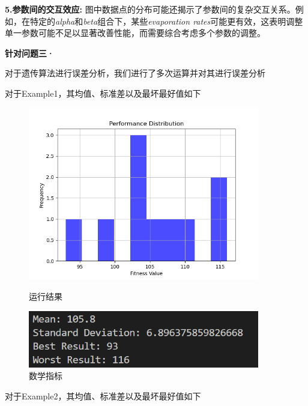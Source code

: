 \documentclass[withoutpreface,bwprint]{thesis-config}
\begin{document}
\par \textbf{5.参数间的交互效应:}
图中数据点的分布可能还揭示了参数间的复杂交互关系。例如，在特定的\textit{alpha}和\textit{beta}组合下，某些\textit{evaporation rates}可能更有效，这表明调整单一参数可能不足以显著改善性能，而需要综合考虑多个参数的调整。


\par \textbf{针对问题三·}
\par 对于遗传算法进行误差分析，我们进行了多次运算并对其进行误差分析
\par 对于Example1，其均值、标准差以及最坏最好值如下
    \begin{figure}[!htbp]
        \centering
        \begin{minipage}[b]{0.5\linewidth}
            \centering
            \includegraphics[width=0.9\textwidth]{figures/4.1.png}
            \caption{运行结果}
        \end{minipage}%
        \begin{minipage}[b]{0.48\linewidth}
            \centering
            \includegraphics[width=0.9\textwidth]{figures/4.2.png}
            \caption{数学指标}
        \end{minipage}%
    \end{figure}
\par 对于Example2，其均值、标准差以及最坏最好值如下
\end{document}
